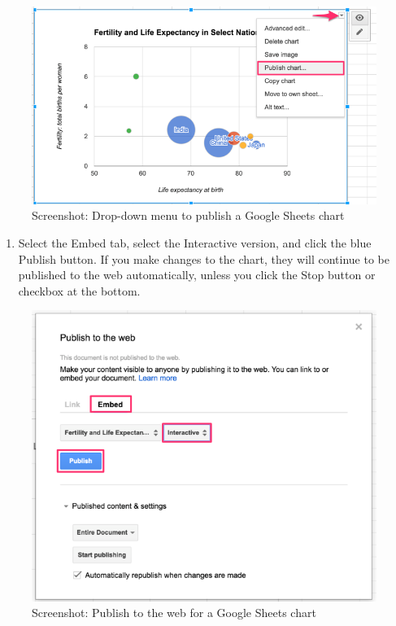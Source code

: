 \documentclass[
  english,
]{book}
\providecommand{\tightlist}{%
  \setlength{\itemsep}{0pt}\setlength{\parskip}{0pt}}
\begin{document}
\begin{figure}
\centering
\includegraphics{images/07-embed/google-sheets-chart-menu-publish.png}
\caption{Screenshot: Drop-down menu to publish a Google Sheets chart}
\end{figure}

\begin{enumerate}
\def\labelenumi{\arabic{enumi})}
\setcounter{enumi}{2}
\tightlist
\item
  Select the Embed tab, select the Interactive version, and click the blue Publish button. If you make changes to the chart, they will continue to be published to the web automatically, unless you click the Stop button or checkbox at the bottom.
\end{enumerate}

\begin{figure}
\centering
\includegraphics{images/07-embed/google-sheets-publish.png}
\caption{Screenshot: Publish to the web for a Google Sheets chart}
\end{figure}
\end{document}
